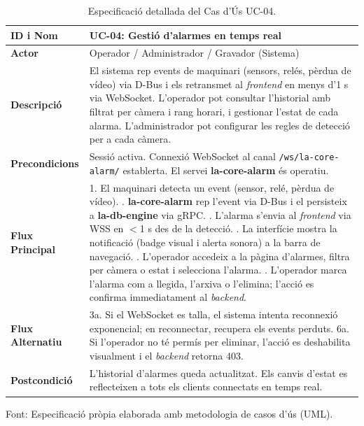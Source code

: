 \begin{table}[htbp]
  \centering
  \small
  \begin{tabular}{|l|p{10cm}|}
    \hline
    \rowcolor{backcolour} \textbf{ID i Nom} & \textbf{UC-04: Gestió d'alarmes en temps real}                                                                                 \\ \hline
    \textbf{Actor}                          & Operador / Administrador / Gravador (Sistema)                                                                                  \\ \hline
    \textbf{Descripció}                     & El sistema rep events de maquinari (sensors, relés, pèrdua de vídeo) via D-Bus i els retransmet al \textit{frontend} en menys d'1 s via WebSocket. L'operador pot consultar l'historial amb filtrat per càmera i rang horari, i gestionar l'estat de cada alarma. L'administrador pot configurar les regles de detecció per a cada càmera.                             \\ \hline
    \textbf{Precondicions}                  & Sessió activa. Connexió WebSocket al canal \texttt{/ws/la-core-alarm/} establerta. El servei \textbf{la-core-alarm} és operatiu. \\ \hline
    \textbf{Flux Principal}                 &
    1. El maquinari detecta un event (sensor, relé, pèrdua de vídeo). \newline
    2. \textbf{la-core-alarm} rep l'event via D-Bus i el persisteix a \textbf{la-db-engine} via gRPC. \newline
    3. L'alarma s'envia al \textit{frontend} via WSS en $<$1 s des de la detecció. \newline
    4. La interfície mostra la notificació (badge visual i alerta sonora) a la barra de navegació. \newline
    5. L'operador accedeix a la pàgina d'alarmes, filtra per càmera o estat i selecciona l'alarma. \newline
    6. L'operador marca l'alarma com a llegida, l'arxiva o l'elimina; l'acció es confirma immediatament al \textit{backend}.               \\ \hline
    \textbf{Flux Alternatiu}                &
    3a. Si el WebSocket es talla, el sistema intenta reconnexió exponencial; en reconnectar, recupera els events perduts. \newline
    6a. Si l'operador no té permís per eliminar, l'acció es deshabilita visualment i el \textit{backend} retorna 403.                      \\ \hline
    \textbf{Postcondició}                   & L'historial d'alarmes queda actualitzat. Els canvis d'estat es reflecteixen a tots els clients connectats en temps real.       \\ \hline
  \end{tabular}
  \caption{Especificació detallada del Cas d'Ús UC-04.}
  \label{tab:uc_alarmes}
\par\smallskip
\small Font: Especificació pròpia elaborada amb metodologia de casos d'ús (UML).
\end{table}


